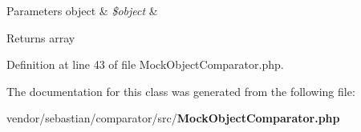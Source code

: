 \begin{DoxyParams}[1]{Parameters}
object & {\em \$object} & \\
\hline
\end{DoxyParams}
\begin{DoxyReturn}{Returns}
array 
\end{DoxyReturn}


Definition at line 43 of file Mock\+Object\+Comparator.\+php.



The documentation for this class was generated from the following file\+:\begin{DoxyCompactItemize}
\item 
vendor/sebastian/comparator/src/{\bf Mock\+Object\+Comparator.\+php}\end{DoxyCompactItemize}
